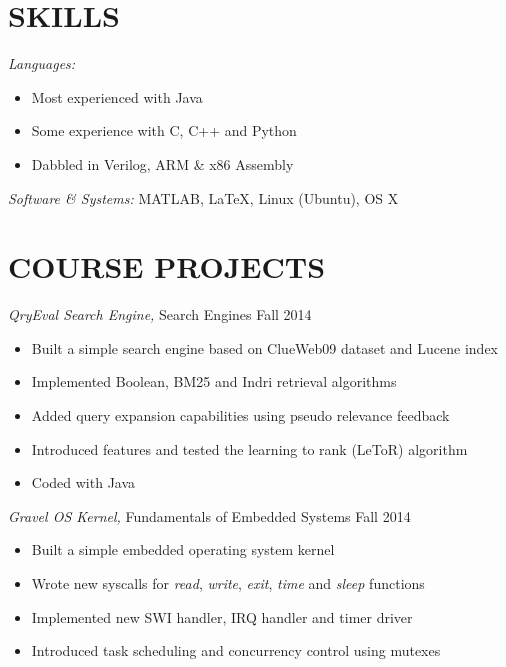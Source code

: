 \documentclass[margin, 10pt]{res} %
\begin{document}
\begin{resume}

\section{SKILLS}

{\sl Languages:}
\begin{itemize} \itemsep -2pt %
\item Most experienced with Java
\item Some experience with C, C++ and Python
\item Dabbled in Verilog, ARM \& x86 Assembly
\end{itemize}
{\sl Software \& Systems:} MATLAB, \LaTeX, Linux (Ubuntu), OS X

\section{COURSE PROJECTS}
{\sl QryEval Search Engine,} Search Engines \hfill Fall 2014 
\begin{itemize} \itemsep -2pt
\item Built a simple search engine based on ClueWeb09 dataset and Lucene index
\item Implemented Boolean, BM25 and Indri retrieval algorithms
\item Added query expansion capabilities using pseudo relevance feedback
\item Introduced features and tested the learning to rank (LeToR) algorithm
\item Coded with Java
\end{itemize}

{\sl Gravel OS Kernel,} Fundamentals of Embedded Systems \hfill Fall 2014 
\begin{itemize} \itemsep -2pt
\item Built a simple embedded operating system kernel
\item Wrote new syscalls for {\sl read}, {\sl write}, {\sl exit}, {\sl time} and {\sl sleep} functions
\item Implemented new SWI handler, IRQ handler and timer driver
\item Introduced task scheduling and concurrency control using mutexes
\end{itemize}




\end{resume}
\end{document}
